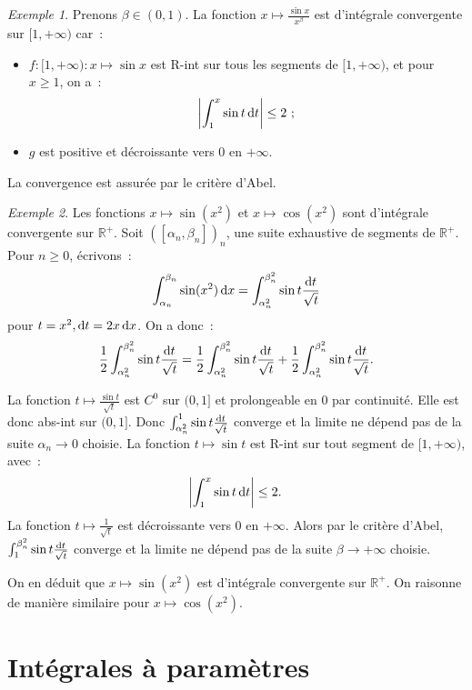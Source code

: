 \documentclass{report}
\theoremstyle{definition}
\theoremstyle{remark}
\newtheorem{ex}{Exemple}[chapter]
\newcommand{\R}{\mathbb R}
\newcommand{\Rp}{\R^{+}}
\newcommand{\pinfty}{{+\infty}}
\begin{document}
			\begin{ex} Prenons $\beta \in (0, 1)$. La fonction $x \mapsto \frac {\sin x}{x^\beta}$ est d'intégrale convergente sur $[1, \pinfty)$ car~:
			\begin{itemize}
				\item $f : [1, \pinfty) : x \mapsto \sin x$ est R-int sur tous les segments de $[1, \pinfty)$, et pour $x \geq 1$, on a~:
				\[\abs {\int_1^x\sin t\dif t} \leq 2~;\]
				\item $g$ est positive et décroissante vers $0$ en $\pinfty$.
			\end{itemize}

			La convergence est assurée par le critère d'Abel.
			\end{ex}

			\begin{ex}Les fonctions $x \mapsto \sin(x^2)$ et $x \mapsto \cos(x^2)$ sont d'intégrale convergente sur $\Rp$. Soit $([\alpha_n, \beta_n])_n$, une suite
			exhaustive de segments de $\Rp$. Pour $n \geq 0$, écrivons~:
			\[\int_{\alpha_n}^{\beta_n}\sin(x^2)\dif x = \int_{\alpha_n^2}^{\beta_n^2}\sin t\frac {\dif t}{\sqrt t}\]
			pour $t = x^2, \dif t = 2x\dif x$. On a donc~:
			\[\frac 12\int_{\alpha_n^2}^{\beta_n^2}\sin t\frac {\dif t}{\sqrt t}
				= \frac 12\int_{\alpha_n^2}^{\beta_n^2}\sin t \frac {\dif t}{\sqrt t} + \frac 12\int_{\alpha_n^2}^{\beta_n^2}\sin t\frac {\dif t}{\sqrt t}.\]

			La fonction $t \mapsto \frac {\sin t}{\sqrt t}$ est $C^0$ sur $(0, 1]$ et prolongeable en $0$ par continuité. Elle est donc abs-int sur $(0, 1]$. Donc
			$\int_{\alpha_n^2}^1\sin t \frac {\dif t}{\sqrt t}$ converge et la limite ne dépend pas de la suite $\alpha_n \to 0$ choisie.
			La fonction $t \mapsto \sin t$ est R-int sur tout segment de $[1, \pinfty)$, avec~:
			\[\abs {\int_1^x\sin t\dif t} \leq 2.\]
			La fonction $t \mapsto \frac 1{\sqrt t}$ est décroissante vers $0$ en $\pinfty$. Alors par le critère d'Abel,
			$\int_1^{\beta_n^2}\sin t\frac {\dif t}{\sqrt t}$ converge et la limite ne dépend pas de la suite $\beta \to \pinfty$ choisie.

			On en déduit que $x \mapsto \sin(x^2)$ est d'intégrale convergente sur $\Rp$. On raisonne de manière similaire pour $x \mapsto \cos(x^2)$.
			\end{ex}

\chapter{Intégrales à paramètres}
\end{document}
